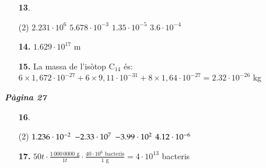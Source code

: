 \documentclass[a4paper, pdf, twoside]{book}
\begin{document}
\begin{multicols}{2}
\begin{enumerate}

 \item[\fontfamily{phv}\selectfont\color{blue}\textbf{13}. ]  \scalebox{0.6}{\simbolclau } 
 \begin{tasks}[column-sep=1em, item-indent=1.3333em](2)
	 \task $2.231\cdot 10^6$
	 \task $5.678\cdot 10^{-3}$
	 \task $1.35\cdot 10^{-5}$
	 \task $3.6\cdot 10^{-4}$
\end{tasks}
\vspace{0.25cm}
\item[\fontfamily{phv}\selectfont\color{blue}\textbf{14. }]  \scalebox{0.6}{\simbolclau } 
$1.629\cdot 10^{17}$ m
\vspace{0.25cm}
\item[\fontfamily{phv}\selectfont\color{blue}\textbf{15. }]  \scalebox{0.6}{\simbolclau } 
La massa de l'isòtop C${}_{14}$ és: $6\times 1,672 \cdot 10^{-27} + 6 \times 9,11 \cdot 10^{-31}+ 8\times 1,64 \cdot 10^{-27} = 2.32\cdot 10^{-26}$ kg
 \end{enumerate}
\vspace{0.3cm}


{\textbf{\em Pàgina 27}} \hrulefill
\begin{enumerate}
\vspace{0.25cm}



 \item[\fontfamily{phv}\selectfont\color{blue}\textbf{16}. ] 
 \begin{tasks}[column-sep=1em, item-indent=1.3333em](2)
	 \task $1.236 \cdot 10^{-2}$
	 \task $-2.33 \cdot 10^{7}$
	 \task $-3.99 \cdot 10^{2}$
	 \task $4.12 \cdot 10^{-6}$
\end{tasks}
 \end{enumerate}
\begin{enumerate}
\vspace{0.25cm}
\item[\fontfamily{phv}\selectfont\color{blue}\textbf{17. }]  \scalebox{0.6}{\simbolclau } 
$50 t \cdot \frac {1\,000\,0000 \text { g}}{1 t} \cdot \frac {40\cdot 10^6 \text { bacteris}}{1 \text { g}}=4\cdot 10^{13}$ bacteris
\vspace{0.25cm}




\end{enumerate}
\end{multicols}
\end{document}
